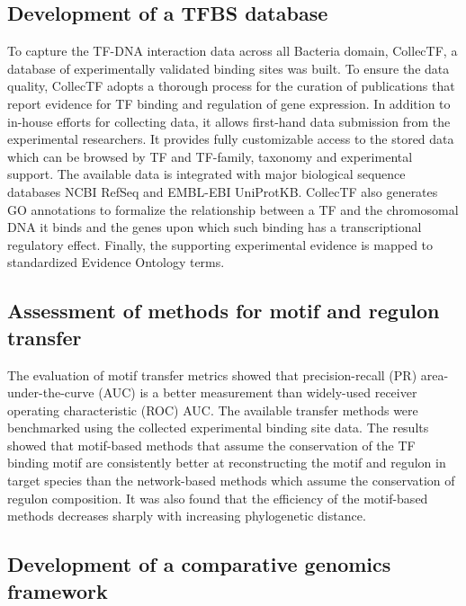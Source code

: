 \subsection{Development of a TFBS database}

To capture the TF-DNA interaction data across all Bacteria domain, CollecTF, a
database of experimentally validated binding sites was built. To ensure the
data quality, CollecTF adopts a thorough process for the curation of
publications that report evidence for TF binding and regulation of gene
expression. In addition to in-house efforts for collecting data, it allows
first-hand data submission from the experimental researchers. It provides fully
customizable access to the stored data which can be browsed by TF and
TF-family, taxonomy and experimental support. The available data is integrated
with major biological sequence databases NCBI RefSeq and EMBL-EBI
UniProtKB\-. CollecTF also generates GO annotations to formalize the relationship
between a TF and the chromosomal DNA it binds and the genes upon which such
binding has a transcriptional regulatory effect. Finally, the supporting experimental
evidence is mapped to standardized Evidence Ontology terms.

\subsection{Assessment of methods for motif and regulon transfer}

The evaluation of motif transfer metrics showed that precision-recall (PR)
area-under-the-curve (AUC) is a better measurement than widely-used receiver
operating characteristic (ROC) AUC\@. The available transfer methods were
benchmarked using the collected experimental binding site data. The results
showed that motif-based methods that assume the conservation of the TF binding
motif are consistently better at reconstructing the motif and regulon in target
species than the network-based methods which assume the conservation of regulon
composition. It was also found that the efficiency of the motif-based methods
decreases sharply with increasing phylogenetic distance.

\subsection{Development of a comparative genomics framework}

